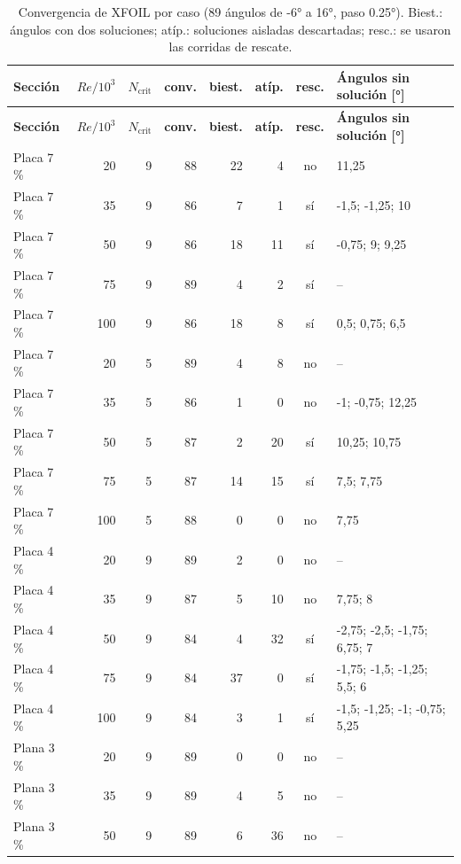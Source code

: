 {\scriptsize
\setlength{\tabcolsep}{4pt}
\begin{longtable}{@{}lrrrrrcl@{}}
\caption{Convergencia de XFOIL por caso (89 ángulos de \ang{-6} a \ang{16}, paso
\ang{0.25}). Biest.: ángulos con dos soluciones; atíp.: soluciones aisladas descartadas;
resc.: se usaron las corridas de rescate.}\label{tab:polares-conv}\\
\toprule
\textbf{Sección} & $Re/10^3$ & $N_{\text{crit}}$ & \textbf{conv.} & \textbf{biest.} & \textbf{atíp.} & \textbf{resc.} & \textbf{Ángulos sin solución [\si{\degree}]}\\\midrule
\endfirsthead
\toprule
\textbf{Sección} & $Re/10^3$ & $N_{\text{crit}}$ & \textbf{conv.} & \textbf{biest.} & \textbf{atíp.} & \textbf{resc.} & \textbf{Ángulos sin solución [\si{\degree}]}\\\midrule
\endhead
Placa 7\,\% & 20 & 9 & 88 & 22 & 4 & no & 11,25\\
Placa 7\,\% & 35 & 9 & 86 & 7 & 1 & sí & -1,5; -1,25; 10\\
Placa 7\,\% & 50 & 9 & 86 & 18 & 11 & sí & -0,75; 9; 9,25\\
Placa 7\,\% & 75 & 9 & 89 & 4 & 2 & sí & --\\
Placa 7\,\% & 100 & 9 & 86 & 18 & 8 & sí & 0,5; 0,75; 6,5\\
\addlinespace[2pt]
Placa 7\,\% & 20 & 5 & 89 & 4 & 8 & no & --\\
Placa 7\,\% & 35 & 5 & 86 & 1 & 0 & no & -1; -0,75; 12,25\\
Placa 7\,\% & 50 & 5 & 87 & 2 & 20 & sí & 10,25; 10,75\\
Placa 7\,\% & 75 & 5 & 87 & 14 & 15 & sí & 7,5; 7,75\\
Placa 7\,\% & 100 & 5 & 88 & 0 & 0 & no & 7,75\\
\addlinespace[2pt]
Placa 4\,\% & 20 & 9 & 89 & 2 & 0 & no & --\\
Placa 4\,\% & 35 & 9 & 87 & 5 & 10 & no & 7,75; 8\\
Placa 4\,\% & 50 & 9 & 84 & 4 & 32 & sí & -2,75; -2,5; -1,75; 6,75; 7\\
Placa 4\,\% & 75 & 9 & 84 & 37 & 0 & sí & -1,75; -1,5; -1,25; 5,5; 6\\
Placa 4\,\% & 100 & 9 & 84 & 3 & 1 & sí & -1,5; -1,25; -1; -0,75; 5,25\\
\addlinespace[2pt]
Plana 3\,\% & 20 & 9 & 89 & 0 & 0 & no & --\\
Plana 3\,\% & 35 & 9 & 89 & 4 & 5 & no & --\\
Plana 3\,\% & 50 & 9 & 89 & 6 & 36 & no & --\\

\end{longtable}}

